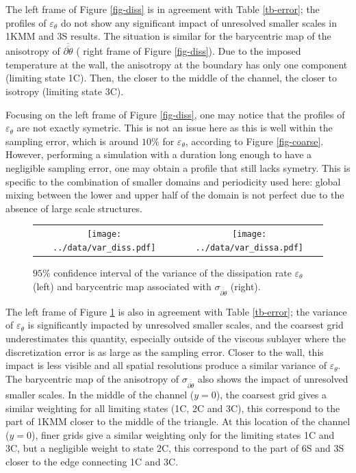 \documentclass[review]{elsarticle}
\newcommand{\epst}{\varepsilon_\theta}
\begin{document}
The {\color{red} left frame of} Figure \ref{fig-diss} is in agreement with Table \ref{tb-error}; the profiles of $\epst$ do not show any significant impact of {\color{red}unresolved} smaller scales in 1KMM and 3S results. The situation is similar for the barycentric map of the anisotropy of $\overline{\overline{\partial \theta}}$ ({\color{red} right frame of} Figure \ref{fig-diss}). Due to the imposed temperature at the wall, the anisotropy at the boundary has only one component (limiting state 1C). Then, the closer to the middle of the channel, the closer to isotropy (limiting state 3C).

{\color{red} Focusing on the left frame of Figure \ref{fig-diss}, one may notice that the profiles of $\epst$ are not exactly symetric. This is not an issue here as this is well within the sampling error, which is around $10\%$ for $\epst$, according to Figure \ref{fig-coarse}. However, performing a simulation with a duration long enough to have a negligible sampling error, one may obtain a profile that still lacks symetry. This is specific to the combination of smaller domains and periodicity used here: global mixing between the lower and upper half of the domain is not perfect due to the absence of large scale structures.}

\begin{figure}[htbp]
\begin{center}
\begin{tabular}{cc}
\texttt{[image: ../data/var\_diss.pdf]} & 
\texttt{[image: ../data/var\_dissa.pdf]}
\end{tabular}
\end{center}
\caption{$95 \%$ confidence interval of the variance of the dissipation rate $\epst$ (left) and barycentric map associated with $\sigma_{\overline{\overline{\partial \theta}}}$ (right).}
\label{fig-var_diss}
\end{figure}

{\color{red} The left frame of} Figure \ref{fig-var_diss} is also in agreement with Table \ref{tb-error}; the variance of $\epst$ is significantly impacted by {\color{red}unresolved} smaller scales, and the coarsest grid underestimates this quantity, especially outside of the viscous sublayer where the discretization error is as large as the sampling error. Closer to the wall, this impact is less visible and all spatial resolutions produce a similar variance of $\epst$. The barycentric map of the anisotropy of $\sigma_{\overline{\overline{\partial \theta}}}$ also shows the impact of {\color{red}unresolved} smaller scales. In the middle of the channel {\color{red}($y=0$)}, the coarsest grid gives a similar weighting for all limiting states (1C, 2C and 3C), this correspond to the part of 1KMM closer to the middle of the triangle. At this location of the channel {\color{red}($y=0$)}, finer grids give a similar weighting only for the limiting states 1C and 3C, but a negligible weight to state 2C, this correspond to the part of 6S and 3S closer to the edge connecting 1C and 3C.
\end{document}
